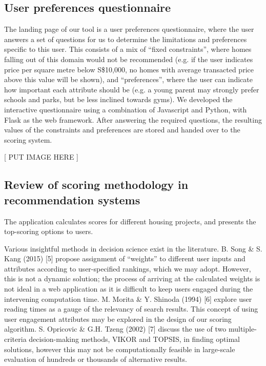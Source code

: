 \documentclass[a4paper, 11pt]{article}
\begin{document}
    \subsection{User preferences questionnaire}
    
    The landing page of our tool is a user preferences questionnaire, where the user answers a set of questions for us to determine the limitations and preferences specific to this user. This consists of a mix of “fixed constraints”, where homes falling out of this domain would not be recommended (e.g. if the user indicates price per square metre below S\$10,000, no homes with average transacted price above this value will be shown), and “preferences”, where the user can indicate how important each attribute should be (e.g. a young parent may strongly prefer schools and parks, but be less inclined towards gyms). We developed the interactive questionnaire using a combination of Javascript and Python, with Flask as the web framework. After answering the required questions, the resulting values of the constraints and preferences are stored and handed over to the scoring system.
    
    [ PUT IMAGE HERE ]
    
    \subsection{Review of scoring methodology in recommendation systems} 
    
    The application calculates scores for different housing projects, and presents the top-scoring options to users.
    
    Various insightful methods in decision science exist in the literature. B. Song \& S. Kang (2015) [5] propose assignment of “weights” to different user inputs and attributes according to user-specified rankings, which we may adopt. However, this is not a dynamic solution; the process of arriving at the calculated weights is not ideal in a web application as it is difficult to keep users engaged during the intervening computation time. M. Morita \& Y. Shinoda (1994) [6] explore user reading times as a gauge of the relevancy of search results. This concept of using user engagement attributes may be explored in the design of our scoring algorithm. S. Opricovic \& G.H. Tzeng (2002) [7] discuss the use of two multiple-criteria decision-making methods, VIKOR and TOPSIS, in finding optimal solutions, however this may not be computationally feasible in large-scale evaluation of hundreds or thousands of alternative results. 
    
\end{document}
